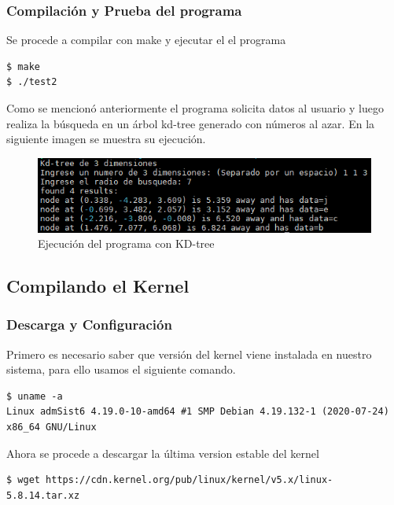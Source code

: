 \documentclass[12pt]{article}
\begin{document}
\subsubsection{Compilación y Prueba del programa}

Se procede a compilar con make y ejecutar el el programa

\begin{lstlisting}[frame=single]
$ make
$ ./test2
\end{lstlisting}

Como se mencionó anteriormente el programa solicita datos al usuario y luego realiza la búsqueda en un árbol kd-tree generado con números al azar. En la siguiente imagen se muestra su ejecución.

\begin{figure}[!h]
   \centering
   \includegraphics[scale=.72]{imgs/kdtree.png}
   \caption{Ejecución del programa con KD-tree}
   \label{fig2}
\end{figure}
\newpage

\subsection{Compilando el Kernel}

\subsubsection{Descarga y Configuración}

Primero es necesario saber que versión del kernel viene instalada en nuestro sistema, para ello usamos el siguiente comando.

\begin{lstlisting}[frame=single]
$ uname -a
Linux admSist6 4.19.0-10-amd64 #1 SMP Debian 4.19.132-1 (2020-07-24) x86_64 GNU/Linux
\end{lstlisting}

Ahora se procede a descargar la última version estable del kernel

\begin{lstlisting}[frame=single]
$ wget https://cdn.kernel.org/pub/linux/kernel/v5.x/linux-5.8.14.tar.xz
\end{lstlisting}
\end{document}

